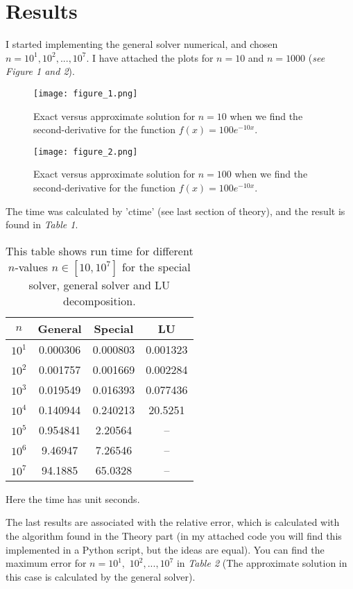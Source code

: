 \documentclass{scrartcl}
\begin{document}
\section{Results}
I started implementing the general solver numerical, and chosen $n=10^1,\!10^2,...,10^7$. I have attached the plots for $n=10$ and $n=1000$ (\textit{see Figure 1 and 2}).\par
\begin{figure}[!htbp]
\centering
\texttt{[image: figure\_1.png]}
\caption{Exact versus approximate solution for $n=10$ when we find the second-derivative for the function $f(x)=100e^{-10x}$. \label{overflow}}
\end{figure}
\begin{figure}[!htbp]
\centering
\texttt{[image: figure\_2.png]}
\caption{Exact versus approximate solution for $n=100$ when we find the second-derivative for the function $f(x)=100e^{-10x}$. \label{overflow}}
\end{figure}
The time was calculated by 'ctime' (see last section of theory), and the result is found in \textit{Table 1}.
\begin{table}[!htbp]
 \centering
 \begin{tabular}{c|c|c|c}
   \toprule
   $n$ & General & Special & LU\\
   \midrule
   $10^1$ & 0.000306 & 0.000803 & 0.001323\\
   $10^2$ & 0.001757 & 0.001669 & 0.002284\\
   $10^3$ & 0.019549 & 0.016393 & 0.077436\\
   $10^4$ & 0.140944 & 0.240213 & 20.5251\\
   $10^5$ & 0.954841 & 2.20564 & --\\
   $10^6$ & 9.46947 & 7.26546 & --\\
   $10^7$ & 94.1885 & 65.0328 & --\\
   \bottomrule
 \end{tabular}
 \caption{This table shows run time for different $n$-values $n\in [10,10^7]$ for the special solver, general solver and LU decomposition.}
 \label{tab:table1}
\end{table}
Here the time has unit seconds.\par\vspace{3mm}
The last results are associated with the relative error, which is calculated with the algorithm found in the Theory part (in my attached code you will find this implemented in a Python script, but the ideas are equal). You can find the maximum error for $n=10^1,\,\,10^2,...,10^7$ in \textit{Table 2} (The approximate solution in this case is calculated by the general solver).
\end{document}
